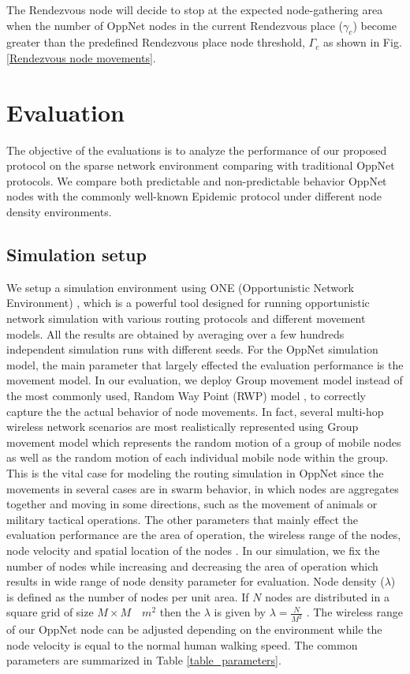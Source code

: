 \documentclass[conference]{IEEEtran}
\begin{document}
The Rendezvous node will decide to stop at the expected node-gathering area when the number of OppNet nodes in the current Rendezvous place ($\gamma_{c}$) become greater than the predefined Rendezvous place node threshold, $\Gamma_{c}$ as shown in Fig. \ref{Rendezvous node movements}.  


\section{Evaluation}
The objective of the evaluations is to analyze the performance of our proposed protocol on the sparse network environment comparing with traditional OppNet protocols.
We compare both predictable and non-predictable behavior OppNet nodes with the commonly well-known Epidemic protocol\cite{Vahdat2000} under different node density environments.


\subsection{Simulation setup}
We setup a simulation environment using ONE (Opportunistic Network Environment) \cite{Keranen2009b}, which is a powerful tool designed for running opportunistic network simulation with various routing protocols and different movement models.
All the results are obtained by averaging over a few hundreds independent simulation runs with different seeds.
For the OppNet simulation model, the main parameter that largely effected the evaluation performance is the movement model.
In our evaluation, we deploy Group movement model instead of the most commonly used, Random Way Point (RWP) model \cite{Batabyal2012}, to correctly capture the the actual behavior of node movements.
In fact, several multi-hop wireless network scenarios are most realistically represented using Group movement model \cite{Blakely2004} which represents the random motion of a group of mobile nodes as well as the random motion of each individual mobile node within the group.
This is the vital case for modeling the routing simulation in OppNet since the movements in several cases are in swarm behavior, in which nodes are aggregates together and moving in some directions, such as the movement of animals or military tactical operations.
The other parameters that mainly effect the evaluation performance are the area of operation, the wireless range of the nodes, node velocity and spatial location of the nodes \cite{Batabyal2012}. 
In our simulation, we fix the number of nodes while increasing and decreasing the area of operation which results in wide range of node density parameter for evaluation.
Node density ($\lambda$) is defined as the number of nodes per unit area. 
If $N$ nodes are distributed in a square grid of size $M \times M \quad{ m }^{ 2 }$ then the $\lambda$ is given by $\lambda =\frac { N }{ { M }^{ 2 } } $ . 
The wireless range of our OppNet node can be adjusted depending on the environment while the node velocity is equal to the normal human walking speed.
The common parameters are summarized in Table \ref{table_parameters}.
\end{document}
